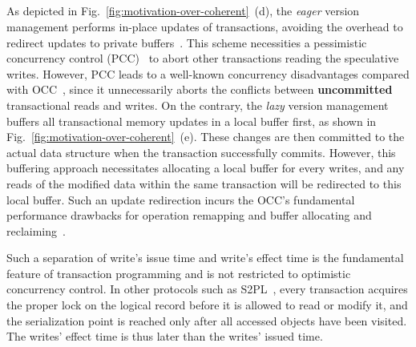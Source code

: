 

\subsection{}


As depicted in Fig.~\ref{fig:motivation-over-coherent}~(d), the \textit{eager} version management performs in-place updates of transactions, avoiding the overhead to redirect updates to private buffers~\cite{dudetm_asplos17}. This scheme necessities a pessimistic concurrency control (PCC)~\cite{book} to abort other transactions reading the speculative writes. However, PCC leads to a well-known concurrency disadvantages compared with OCC~\cite{thousandcore_vldb14}, since it unnecessarily aborts the conflicts between \textbf{uncommitted} transactional reads and writes. 
On the contrary, the \textit{lazy} version management buffers all transactional memory updates in a local buffer first, as shown in Fig.~\ref{fig:motivation-over-coherent}~(e). These changes are then committed to the actual data structure when the transaction successfully commits. However, this buffering approach necessitates allocating a local buffer for every writes, and any reads of the modified data within the same transaction will be redirected to this local buffer. Such an update redirection incurs the OCC's fundamental performance drawbacks for operation remapping and buffer allocating and reclaiming~\cite{thousandcore_vldb14, mvcc_vldb17}. 


Such a separation of write's issue time and write's effect time is the fundamental feature of transaction programming and is not restricted to optimistic concurrency control. 
In other protocols such as S2PL~\cite{mvcc_vldb17, s2pl_dataeng87, s2pl_csur81}, every transaction acquires the proper lock on the logical record before it is allowed to read or modify it, and the serialization point is reached only after all accessed objects have been visited. The writes' effect time is thus later than the writes' issued time. 


